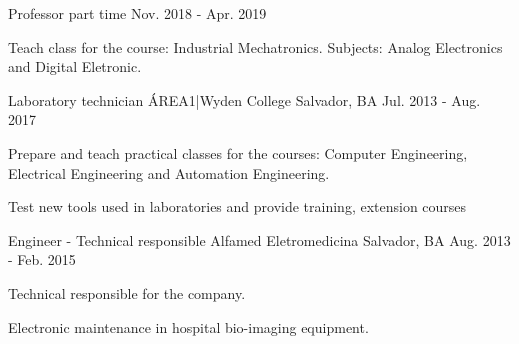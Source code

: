\begin{cventries}
  \cventry
    {Professor part time} %
    {} %
    {} %
    {Nov. 2018 - Apr. 2019} %
    {
      \begin{cvitems} %
        \item {Teach class for the course: Industrial Mechatronics. Subjects: Analog Electronics and Digital Eletronic.}
      \end{cvitems}
    }

    
  \cventry
    {Laboratory technician} %
    {ÁREA1|Wyden College} %
    {Salvador, BA} %
    {Jul. 2013 - Aug. 2017} %
    {
      \begin{cvitems} %
        \item {Prepare and teach practical classes for the courses: Computer Engineering, Electrical Engineering and Automation Engineering.}
        \item {Test new tools used in laboratories and provide training, extension courses}
      \end{cvitems}
    }

  \cventry
    {Engineer - Technical responsible} %
    {Alfamed Eletromedicina} %
    {Salvador, BA} %
    {Aug. 2013 - Feb. 2015} %
    {
      \begin{cvitems} %
        \item {Technical responsible for the company.}
        \item {Electronic maintenance in hospital bio-imaging equipment.}
      \end{cvitems}
    }
    

\end{cventries}
